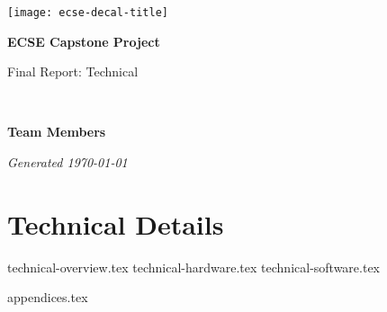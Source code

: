 \documentclass{capstone}
\begin{document}

\titlepage
	{\texttt{[image: ecse-decal-title]}}
	{
		\centering\sffamily
		{\Huge\bfseries ECSE Capstone Project\par}
		\vspace{16pt} 
		{\LARGE Final Report: Technical \par} 
		\vspace{24pt}
		{\huge\bfseries \teamname\par} %
	}


~\vfill

\noindent \textbf{Team Members}
\teammembers

\noindent \textit{Generated \today}

\tableofcontents

\cleardoublepage

\part{Technical Details}
{technical-overview.tex}
{technical-hardware.tex}
{technical-software.tex}

\begin{appendices}
{appendices.tex}
\end{appendices}
\end{document}
